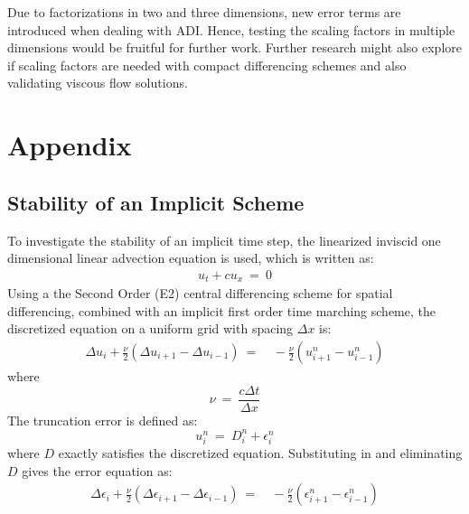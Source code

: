 \documentclass[conf]{new-aiaa}
\begin{document}
Due to factorizations in two and three dimensions, new error terms are introduced when dealing with ADI. 
Hence, testing the scaling factors in multiple dimensions would be fruitful for further work. 
Further research might also explore if scaling factors are needed with compact differencing schemes and also validating viscous flow solutions. 

\section{Appendix}
\subsection{Stability of an Implicit Scheme}
{
{\label{Sec:Appendix:Stability_Fourier}
To investigate the stability of an implicit time step, the linearized inviscid one dimensional linear advection equation is used, which is written as:
\begin{equation}
	\begin{split}
		\label{eq:LAE_Simple_Version}
  			u_t+cu_x~=~0
	\end{split}
\end{equation}
Using a the Second Order (E2) central differencing scheme for spatial differencing, combined with an implicit first order time marching scheme, the discretized equation on a uniform grid with spacing $\Delta{x}$ is:
\begin{equation}
	\begin{split}
		\label{eq:LAE_RDRP}
  			\Delta{u_i}+\frac{\nu}{2}\left(\Delta{u_{i+1}}-\Delta{u_{i-1}}\right) ~=&~-\frac{\nu}{2}\left(u^n_{i+1}-u^n_{i-1}\right)
	\end{split}
\end{equation}
where
\begin{equation*}
	\nu~=~\frac{c\Delta{t}}{\Delta{x}}
\end{equation*}
The truncation error is defined as:
\begin{equation*}
	u_i^n~=~D_i^n+\epsilon_i^n
\end{equation*}
where $D$ exactly satisfies the discretized equation. Substituting in and eliminating $D$ gives the error equation as:
\begin{equation}
	\begin{split}
		\label{eq:Error_Equation}
  			\Delta{\epsilon_i}+\frac{\nu}{2}\left(\Delta{\epsilon_{i+1}}-\Delta{\epsilon_{i-1}}\right) ~=&~-\frac{\nu}{2}\left(\epsilon^n_{i+1}-\epsilon^n_{i-1}\right)
	\end{split}

\end{equation}}}
\end{document}
